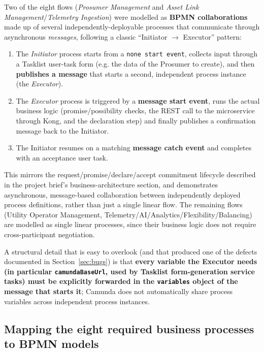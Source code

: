 \documentclass[11pt,a4paper]{article}
\begin{document}
Two of the eight flows (\emph{Prosumer Management} and \emph{Asset Link
Management}/\emph{Telemetry Ingestion}) were modelled as \textbf{BPMN
collaborations} made up of several independently-deployable processes that
communicate through asynchronous \emph{messages}, following a classic
``Initiator $\rightarrow$ Executor'' pattern:
 
\begin{enumerate} \item The \emph{Initiator} process starts from a \texttt{none start event}, collects input through a Tasklist user-task form (e.g. the data of the Prosumer to create), and then \textbf{publishes a message} that starts a second, independent process instance (the \emph{Executor}). \item The \emph{Executor} process is triggered by a \textbf{message start event}, runs the actual business logic (promise/possibility checks, the REST call to the microservice through Kong, and the declaration step) and finally publishes a confirmation message back to the Initiator. \item The Initiator resumes on a matching \textbf{message catch event} and completes with an acceptance user task.
\end{enumerate}
 
This mirrors the request/promise/declare/accept commitment lifecycle described
in the project brief's business-architecture section, and demonstrates
asynchronous, message-based collaboration between independently deployed
process definitions, rather than just a single linear flow. The remaining flows
(Utility Operator Management, Telemetry/AI/Analytics/Flexibility/Balancing)
are modelled as single linear processes, since their business logic does not
require cross-participant negotiation.
 
A structural detail that is easy to overlook (and that produced one of the
defects documented in Section~\ref{sec:bugs}) is that \textbf{every variable
the Executor needs (in particular \texttt{camundaBaseUrl}, used by Tasklist
form-generation service tasks) must be explicitly forwarded in the
\texttt{variables} object of the message that starts it}; Camunda does not
automatically share process variables across independent process instances.
 
\subsection{Mapping the eight required business processes to BPMN models}
 
\end{document}
